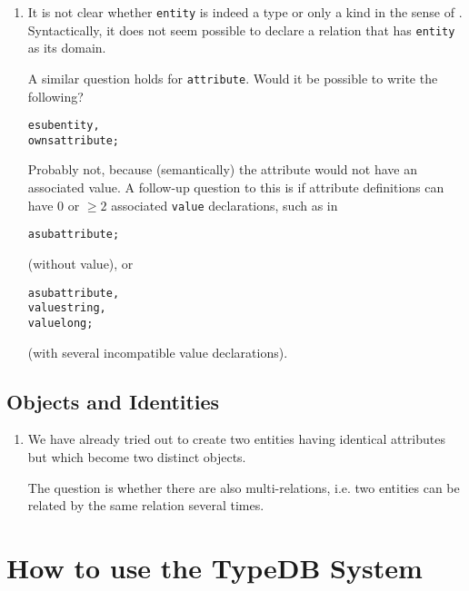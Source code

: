 \documentclass{article}
\begin{document}
\begin{enumerate}

	


\item It is not clear whether \texttt{entity} is indeed a type or only a kind
  in the sense of . Syntactically, it does not
  seem possible to declare a relation that has \texttt{entity} as its domain.

  A similar question holds for \texttt{attribute}. Would it be possible to
  write the following?

  \begin{alltt}
  e sub entity,
    owns attribute;
  \end{alltt}

  Probably not, because (semantically) the attribute would not have an
  associated value. A follow-up question to this is if attribute definitions
  can have 0 or $\geq 2$ associated \texttt{value} declarations, such as in
  \begin{alltt}
    a sub attribute;
  \end{alltt}
  (without value),  or
  \begin{alltt}
    a sub attribute,
    value string,
    value long;
  \end{alltt}
  (with several incompatible value declarations).

\end{enumerate}



\subsection{Objects and Identities}

\begin{enumerate}
\item We have already tried out to create two entities having identical
  attributes but which become two distinct objects.

  The question is whether there are also multi-relations, i.e. two entities
  can be related by the same relation several times.
\end{enumerate}




\section{How to use the TypeDB System}
\end{document}
